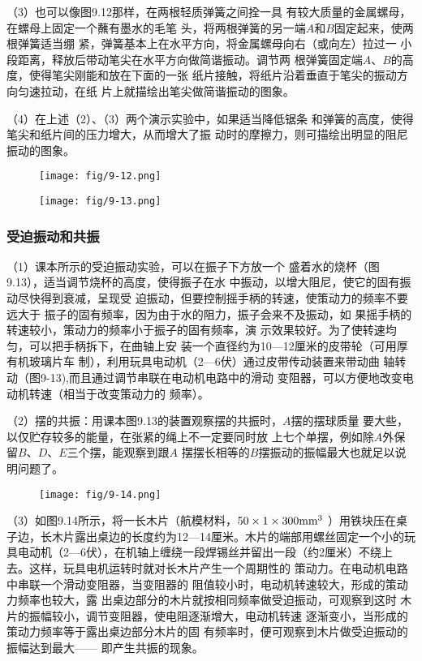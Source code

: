 （3）也可以像图9.12那样，在两根轻质弹簧之间拴一具
有较大质量的金属螺母，在螺母上固定一个蘸有墨水的毛笔
头，将两根弹簧的另一端$A$和$B$固定起来，使两根弹簧适当绷
紧，弹簧基本上在水平方向，将金属螺母向右（或向左）拉过一
小段距离，释放后带动笔尖在水平方向做简谐振动。调节两
根弹簧固定端$A$、$B$的高度，使得笔尖刚能和放在下面的一张
纸片接触，将纸片沿着垂直于笔尖的振动方向匀速拉动，在纸
片上就描绘出笔尖做简谐振动的图象。

（4）在上述（2）、（3）两个演示实验中，如果适当降低锯条
和弹簧的高度，使得笔尖和纸片间的压力增大，从而增大了振
动时的摩擦力，则可描绘出明显的阻尼振动的图象。
\begin{figure}[htp]\centering
    \begin{minipage}[t]{0.48\textwidth}
    \centering
\texttt{[image: fig/9-12.png]}
    \caption{}
    \end{minipage}
    \begin{minipage}[t]{0.48\textwidth}
    \centering
\texttt{[image: fig/9-13.png]}
    \caption{}
    \end{minipage}
    \end{figure}

\subsubsection{受迫振动和共振}
（1）课本所示的受迫振动实验，可以在振子下方放一个
盛着水的烧杯（图9.13），适当调节烧杯的高度，使得振子在水
中振动，以增大阻尼，使它的固有振动尽快得到衰减，呈现受
迫振动，但要控制摇手柄的转速，使策动力的频率不要远大于
振子的固有频率，因为由于水的阻力，振子会来不及振动，如
果摇手柄的转速较小，策动力的频率小于振子的固有频率，演
示效果较好。为了使转速均匀，可以把手柄拆下，在曲轴上安
装一个直径约为10—12厘米的皮带轮（可用厚有机玻璃片车
制），利用玩具电动机（2—6伏）通过皮带传动装置来带动曲
轴转动（图9-13),而且通过调节串联在电动机电路中的滑动
变阻器，可以方便地改变电动机转速（相当于改变策动力的
频率）。

（2）摆的共振：用课本图9.13的装置观察摆的共振时，$A$摆的摆球质量
要大些，以仅贮存较多的能量，在张紧的绳上不一定要同时放
上七个单摆，例如除$A$外保留$B$、$D$、$E$三个摆，能观察到跟$A$
摆摆长相等的$B$摆振动的振幅最大也就足以说明问题了。

\begin{figure}[htp]
    \centering
    \texttt{[image: fig/9-14.png]}
    \caption{}
\end{figure}

（3）如图9.14所示，将一长木片（航模材料，$50\times1\times300{\rm mm^3}$
）用铁块压在桌子边，长木片露出桌边的长度约为12—14厘米。木片的端部用螺丝固定一个小的玩具电动机（2—6伏），在机轴上缠绕一段焊锡丝并留出一段（约2厘米）不绕上
去。这样，玩具电机运转时就对长木片产生一个周期性的
策动力。在电动机电路中串联一个滑动变阻器，当变阻器的
阻值较小时，电动机转速较大，形成的策动力频率也较大，露
出桌边部分的木片就按相同频率做受迫振动，可观察到这时
木片的振幅较小，调节变阻器，使电阻逐渐增大，电动机转速
逐渐变小，当形成的策动力频率等于露出桌边部分木片的固
有频率时，便可观察到木片做受迫振动的振幅达到最大——
即产生共振的现象。

